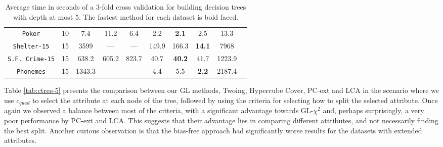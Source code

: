 \begin{table}[]
\begin{tabular}{c|c|c|c|c|c|c|c|c|c}
{\tt Poker}         & 10 & 7.4        & 11.2       & 6.4         & 2.2       & {\bf 2.1}  & 2.5        & 13.3       &            \\
{\tt Shelter-15}    & 15 & 3599       & ---        & ---         & 149.9     & 166.3      & {\bf 14.1 }& 7968       &            \\   
{\tt S.F. Crime-15} & 15 & 638.2      & 605.2      & 823.7       & 40.7      & {\bf 40.2} & 41.7       & 1223.9     &            \\ 
{\tt Phonemes}      & 15 & 1343.3     & ---        & ---         & 4.4       & 5.5        & {\bf 2.2 } & 2187.4     &
\end{tabular}
\caption{Average time in seconds of a 3-fold cross validation for building decision trees with depth at most 5. The fastest method for each dataset is bold faced.}
\label{tab:time-5}
\end{table}



Table \ref{tab:ctree-5} presents the 
comparison between our GL methods, Twoing, Hypercube Cover, PC-ext and LCA in the scenario where we use $c_{quad}$ to select the attribute at each node of the tree, followed by using the criteria for selecting how to split the selected attribute. Once again we observed a balance between most of the criteria, with a significant advantage towards GL-$\chi^2$ and, perhaps surprisingly, a very poor performance by PC-ext and LCA. This suggests that their advantage lies in comparing different attributes, and not necessarily finding the best split. Another curious observation is that the bias-free approach had significantly worse results for the datasets with extended attributes.


